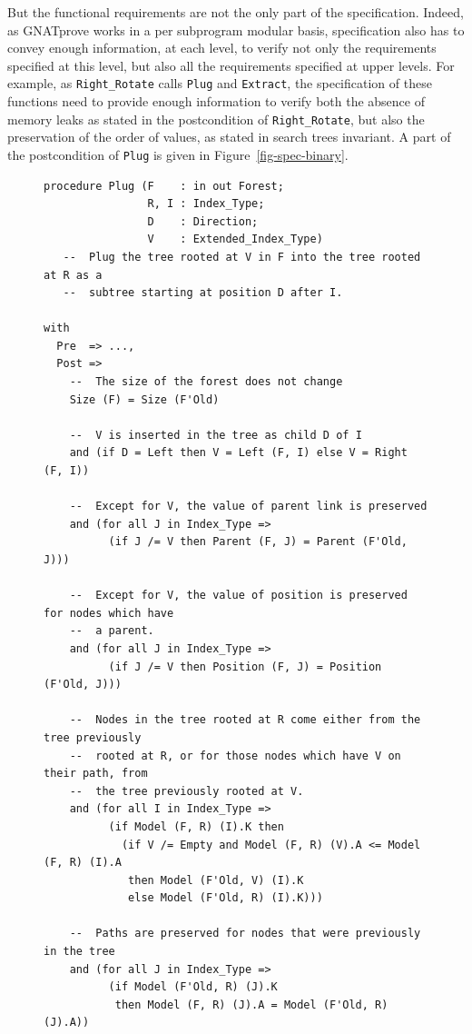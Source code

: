 \documentclass[11pt,a4paper]{article}
\newcommand{\gnatprove}{GNATprove\xspace}
\begin{document}
But the functional requirements are not the only part of the specification. Indeed, as \gnatprove works in a per
subprogram modular basis, specification also has to convey enough information, at each level, to verify not only the
requirements specified at this level, but also all the requirements specified at upper levels. For example, as
\texttt{Right\_Rotate} calls \texttt{Plug} and \texttt{Extract}, the specification of these functions need to provide
enough information to
verify both the absence of memory leaks as stated in the postcondition of \texttt{Right\_Rotate}, but also the preservation of
the order of values, as stated in search trees invariant. A part of the postcondition of \texttt{Plug} is given in
Figure~\ref{fig-spec-binary}.

\begin{figure}
\begin{small}
\begin{lstlisting}
procedure Plug (F    : in out Forest;
                R, I : Index_Type;
                D    : Direction;
                V    : Extended_Index_Type)
   --  Plug the tree rooted at V in F into the tree rooted at R as a
   --  subtree starting at position D after I.

with
  Pre  => ...,
  Post =>
    --  The size of the forest does not change
    Size (F) = Size (F'Old)

    --  V is inserted in the tree as child D of I
    and (if D = Left then V = Left (F, I) else V = Right (F, I))

    --  Except for V, the value of parent link is preserved
    and (for all J in Index_Type =>
          (if J /= V then Parent (F, J) = Parent (F'Old, J)))

    --  Except for V, the value of position is preserved for nodes which have
    --  a parent.
    and (for all J in Index_Type =>
          (if J /= V then Position (F, J) = Position (F'Old, J)))

    --  Nodes in the tree rooted at R come either from the tree previously
    --  rooted at R, or for those nodes which have V on their path, from
    --  the tree previously rooted at V.
    and (for all I in Index_Type =>
          (if Model (F, R) (I).K then
            (if V /= Empty and Model (F, R) (V).A <= Model (F, R) (I).A
             then Model (F'Old, V) (I).K
             else Model (F'Old, R) (I).K)))

    --  Paths are preserved for nodes that were previously in the tree
    and (for all J in Index_Type =>
          (if Model (F'Old, R) (J).K
           then Model (F, R) (J).A = Model (F'Old, R) (J).A))


\end{lstlisting}
\end{small}
\end{figure}
\end{document}
